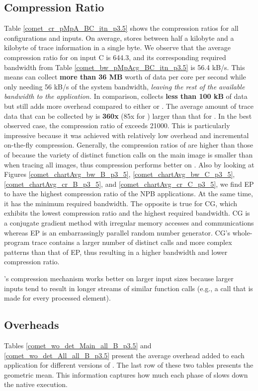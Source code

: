 \subsection{Compression Ratio}
\label{subsec:cr}
Table \ref{comet_cr_pMpA_BC_itn_p3.5} shows the compression ratios for all configurations and inputs.
%
On average, \parlot stores between half a kilobyte and a kilobyte of trace information in a single byte.
%
We observe that the
average compression ratio for \parlota on input C is 644.3, and its
corresponding required bandwidth from Table
\ref{comet_bw_pMpAcg_BC_itn_p3.5} is 56.4 kB/s.
%
This means \parlot can
collect \textbf{more than 36 MB} worth of data per core per second
while only needing 56 kB/s of the system bandwidth, {\em leaving the rest of the available bandwidth to the application.}
%
In comparison, \callgrind
collects \textbf{less than 100 kB} of data but still adds more
overhead compared to either \parlota or \parlotm .
%
The average amount of trace data that can be collected by \parlota is
\textbf{360x} (85x for \parlotm) larger than that for \callgrind.
%
In the best observed case, the compression ratio of
\parlot exceeds 21000.
%
This is particularly impressive because it was achieved with relatively low overhead and incremental
on-the-fly compression.
%
Generally, the compression ratios of \parlotm are higher than those of \parlota because the variety of distinct function calls on the main image is smaller than when tracing all images, thus compression performs better on \parlotm.
Also by looking at Figures \ref{comet_chartAvg_bw_B_p3_5}, \ref{comet_chartAvg_bw_C_p3_5}, \ref{comet_chartAvg_cr_B_p3_5}, and \ref{comet_chartAvg_cr_C_p3_5}, we find EP to have the highest compression ratio of the NPB applications. At the same time, it has the minimum required bandwidth. The opposite is true for CG, which exhibits the lowest compression ratio and the highest required bandwidth. CG is a conjugate gradient method with irregular memory accesses and communications whereas EP is an embarrassingly parallel random number generator. CG's whole-program trace contains a larger number of distinct calls and more complex patterns than that of EP, thus resulting in a higher bandwidth and lower compression ratio.
%

\parlot's compression mechanism works better on larger input sizes because larger inputs tend to result in longer streams of similar function calls (e.g., a call that is made for every processed element).



\subsection{Overheads}
\label{subsec:pinit}
Tables \ref{comet_wo_det_Main_all_B_p3.5} and
\ref{comet_wo_det_All_all_B_p3.5} present the average overhead added to each
application for different versions of \parlot.
%
The last row of these two tables
presents the geometric mean.
%
This information captures how much each
phase of \parlot slows down the native execution.


